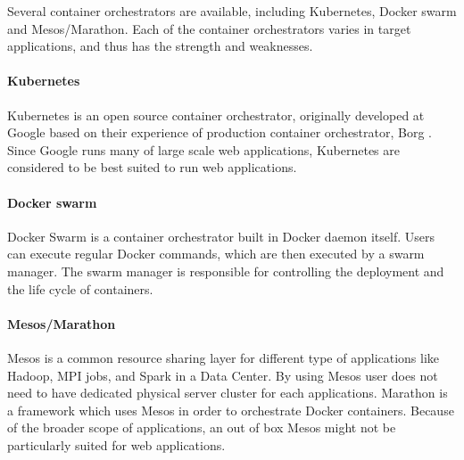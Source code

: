 Several container orchestrators are available, including Kubernetes, Docker swarm and Mesos/Marathon.
Each of the container orchestrators varies in target applications, and thus has the strength and weaknesses.

\paragraph{Kubernetes}
Kubernetes \cite{burns2016borg} is an open source container orchestrator, originally developed at Google based on their experience of production container orchestrator, Borg \cite{Verma2015}. 
Since Google runs many of large scale web applications, Kubernetes are considered to be best suited to run web applications.

\paragraph{Docker swarm}
Docker Swarm is a container orchestrator built in Docker daemon itself.
Users can execute regular Docker commands, which are then executed by a swarm manager. 
The swarm manager is responsible for controlling the deployment and the life cycle of containers.

\paragraph{Mesos/Marathon}
Mesos \cite{hindman2011mesos} is a common resource sharing layer for different type of applications like Hadoop, MPI jobs, and Spark in a Data Center. 
By using Mesos user does not need to have dedicated physical server cluster for each applications.
Marathon is a framework which uses Mesos in order to orchestrate Docker containers.
Because of the broader scope of applications, an out of box Mesos might not be particularly suited for web applications.

